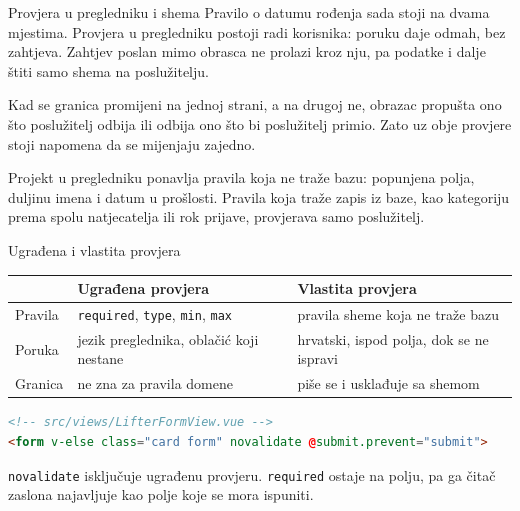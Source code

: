 \begin{frame}{Provjera u pregledniku i shema}
Pravilo o datumu rođenja sada stoji na dvama mjestima. Provjera u pregledniku postoji radi korisnika: poruku daje odmah, bez zahtjeva. Zahtjev poslan mimo obrasca ne prolazi kroz nju, pa podatke i dalje štiti samo shema na poslužitelju.

\vspace{0.9em}
Kad se granica promijeni na jednoj strani, a na drugoj ne, obrazac propušta ono što poslužitelj odbija ili odbija ono što bi poslužitelj primio. Zato uz obje provjere stoji napomena da se mijenjaju zajedno.

\vspace{0.9em}
\begin{konvencija}
Projekt u pregledniku ponavlja pravila koja ne traže bazu: popunjena polja, duljinu imena i datum u prošlosti. Pravila koja traže zapis iz baze, kao kategoriju prema spolu natjecatelja ili rok prijave, provjerava samo poslužitelj.
\end{konvencija}
\end{frame}

\begin{frame}[fragile]{Ugrađena i vlastita provjera}
\vspace{0.3em}
\begin{center}
{\small
\setlength{\tabcolsep}{6pt}
\renewcommand{\arraystretch}{1.35}
\begin{tabular}{@{}L{2.0cm}L{4.4cm}L{4.6cm}@{}}
  \toprule
   & \textbf{Ugrađena provjera} & \textbf{Vlastita provjera} \\
  \midrule
  Pravila & \texttt{required}, \texttt{type}, \texttt{min}, \texttt{max} & pravila sheme koja ne traže bazu \\
  Poruka & jezik preglednika, oblačić koji nestane & hrvatski, ispod polja, dok se ne ispravi \\
  Granica & ne zna za pravila domene & piše se i usklađuje sa shemom \\
  \bottomrule
\end{tabular}
}
\end{center}

\vspace{0.4em}
\begin{lstlisting}[language=html]
<!-- src/views/LifterFormView.vue -->
<form v-else class="card form" novalidate @submit.prevent="submit">
\end{lstlisting}

\vspace{0.2em}
\texttt{novalidate} isključuje ugrađenu provjeru. \texttt{required} ostaje na polju, pa ga čitač zaslona najavljuje kao polje koje se mora ispuniti.
\end{frame}

